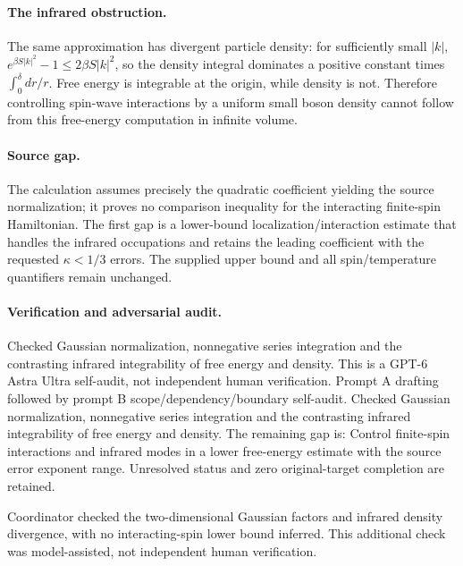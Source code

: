 \documentclass[11pt]{article}
\begin{document}
\paragraph{The infrared obstruction.} The same approximation has divergent particle density: for sufficiently small \(|k|\), \(e^{\beta S|k|^2}-1\le2\beta S|k|^2\), so the density integral dominates a positive constant times \(\int_0^\delta dr/r\). Free energy is integrable at the origin, while density is not. Therefore controlling spin-wave interactions by a uniform small boson density cannot follow from this free-energy computation in infinite volume.
\paragraph{Source gap.} The calculation assumes precisely the quadratic coefficient yielding the source normalization; it proves no comparison inequality for the interacting finite-spin Hamiltonian. The first gap is a lower-bound localization/interaction estimate that handles the infrared occupations and retains the leading coefficient with the requested \(\kappa<1/3\) errors. The supplied upper bound and all spin/temperature quantifiers remain unchanged.

\paragraph{Verification and adversarial audit.}
Checked Gaussian normalization, nonnegative series integration and the contrasting infrared integrability of free energy and density. This is a GPT-6 Astra Ultra self-audit, not independent human verification. Prompt A drafting followed by prompt B scope/dependency/boundary self-audit. Checked Gaussian normalization, nonnegative series integration and the contrasting infrared integrability of free energy and density. The remaining gap is: Control finite-spin interactions and infrared modes in a lower free-energy estimate with the source error exponent range. Unresolved status and zero original-target completion are retained.

Coordinator checked the two-dimensional Gaussian factors and infrared density divergence, with no interacting-spin lower bound inferred. This additional check was model-assisted, not independent human verification.
\end{document}
